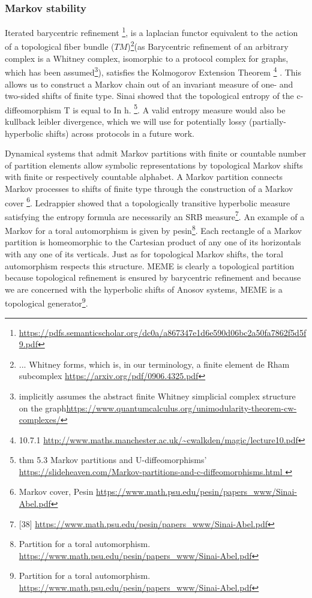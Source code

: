 \documentclass{article}
\begin{document}
\subsubsection{Markov stability}
Iterated barycentric refinement \footnote{\url{https://pdfs.semanticscholar.org/dc0a/a867347e1d6e590d06bc2a50fa7862f5d5f9.pdf}}, is a laplacian functor equivalent to the action of a topological fiber bundle ($TM$)\footnote{ ... Whitney forms, which is, in our terminology, a finite element de Rham subcomplex \url{https://arxiv.org/pdf/0906.4325.pdf}}(as Barycentric refinement of an arbitrary complex is a Whitney complex, isomorphic to a protocol complex for graphs, which has been assumed\footnote{implicitly assumes the abstract finite Whitney simplicial complex structure on the graph\url{https://www.quantumcalculus.org/unimodularity-theorem-cw-complexes/}}), satisfies the Kolmogorov Extension Theorem \footnote{10.7.1 \url{http://www.maths.manchester.ac.uk/~cwalkden/magic/lecture10.pdf}} . This allows us to construct a Markov chain out of an invariant measure of one- and two-sided shifts of finite type. Sinai showed that the topological entropy of the c-diffeomorphism T is equal to In h. \footnote{thm 5.3 Markov partitions and U-diffeomorphisms' \url{https://slideheaven.com/Markov-partitions-and-c-diffeomorphisms.html }}. A valid entropy measure would also be kullback leibler divergence, which we will use for potentially lossy (partially-hyperbolic shifts) across protocols in a future work.

Dynamical systems that admit Markov partitions with finite or countable number of partition elements allow symbolic representations by topological Markov shifts with finite or respectively countable alphabet. A Markov partition connects Markov processes to shifts of finite type through the construction of a Markov cover \footnote{Markov cover, Pesin \url{https://www.math.psu.edu/pesin/papers_www/Sinai-Abel.pdf}}. Ledrappier showed that a topologically transitive hyperbolic measure satisfying the entropy formula are necessarily an SRB measure\footnote{[38] \url{https://www.math.psu.edu/pesin/papers_www/Sinai-Abel.pdf}}. An example of a Markov for a toral automorphism is given by pesin\footnote{Partition for a toral automorphism. \url{https://www.math.psu.edu/pesin/papers_www/Sinai-Abel.pdf}}. Each rectangle of a Markov partition is homeomorphic to the Cartesian product of any one of its horizontals with any one of its verticals. Just as for topological Markov shifts, the toral automorphism respects this structure. MEME is clearly a topological partition because topological refinement is ensured by barycentric refinement and because we are concerned with the hyperbolic shifts of Anosov systems, MEME is a topological generator\footnote{Partition for a toral automorphism. \url{https://www.math.psu.edu/pesin/papers_www/Sinai-Abel.pdf}}.
\end{document}
